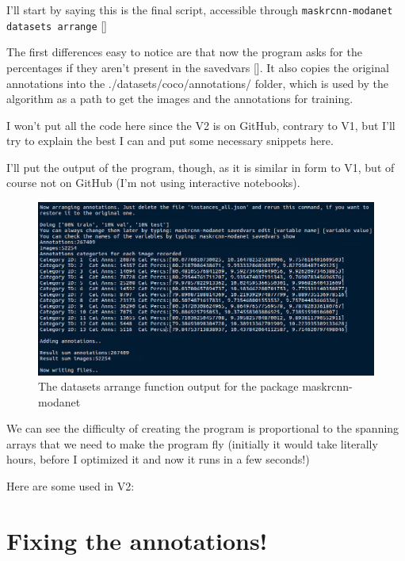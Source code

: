 I'll start by saying this is the final script, accessible through \lstinline[language=bash]|maskrcnn-modanet datasets arrange| []

The first differences easy to notice are that now the program asks for the percentages if they aren't present in the savedvars []. It also copies the original annotations into the ./datasets/coco/annotations/ folder, which is used by the algorithm as a path to get the images and the annotations for training.

I won't put all the code here since the V2 is on GitHub, contrary to V1, but I'll try to explain the best I can and put some necessary snippets here.

I'll put the output of the program, though, as it is similar in form to V1, but of course not on GitHub (I'm not using interactive notebooks).

\begin{figure}[H]
	\centering
	\includegraphics[width=\linewidth]{figures/anns/bestfixed}
	\caption{The datasets arrange function output for the package maskrcnn-modanet}
	\label{f:anns-bestfixed}
\end{figure}

We can see the difficulty of creating the program is proportional to the spanning arrays that we need to make the program fly (initially it would take literally hours, before I optimized it and now it runs in a few seconds!)

Here are some used in V2:




\section{Fixing the annotations!}\label{s:fixing}

